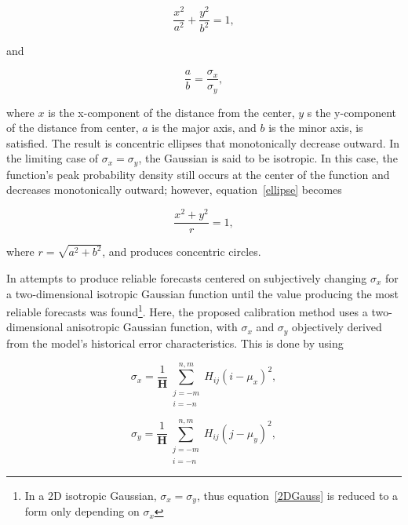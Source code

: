     \begin{equation}
        \label{ellipse}
        \frac{x^2}{a^2} + \frac{y^2}{b^2} = 1,
    \end{equation}

\noindent and

    \begin{equation}
        \frac{a}{b} = \frac{\sigma_x}{\sigma_y},
    \end{equation}

\noindent where $x$ is the x-component of the distance from the center, $y$ s the y-component of the distance from center, $a$ is the major axis, and $b$ is the minor axis, is satisfied.
The result is concentric ellipses that monotonically decrease outward.
In the limiting case of $\sigma_x = \sigma_y$, the Gaussian is said to be isotropic.
In this case, the function's peak probability density still occurs at the center of the function and decreases monotonically outward; however, \mbox{equation \ref{ellipse}} becomes

    \begin{equation*}
        \frac{x^2 + y^2}{r} = 1,
    \end{equation*}

\noindent where $r = \sqrt{a^2 + b^2}$, and produces concentric circles.

In \cite{Sobash2011} attempts to produce reliable forecasts centered on subjectively changing $\sigma_x$ for a two-dimensional isotropic Gaussian function until the value producing the most reliable forecasts was found\footnote{In a 2D isotropic Gaussian, $\sigma_x = \sigma_y$, thus \mbox{equation \ref{2DGauss}} is reduced to a form only depending on $\sigma_x$}.
Here, the proposed calibration method uses a two-dimensional anisotropic Gaussian function, with $\sigma_x$ and $\sigma_y$ objectively derived from the model's historical error characteristics.
This is done by using

    \begin{equation}
        \label{sigmax}
        \sigma_x = \frac{1}{\mathbf{H}} \sum\limits_{\substack{j=-m \\ i=-n}}^{n,m}H_{ij}(i - \mu_x)^2,
    \end{equation}

    \begin{equation}
        \label{sigmay}
        \sigma_y = \frac{1}{\mathbf{H}} \sum\limits_{\substack{j=-m \\ i=-n}}^{n,m}H_{ij}(j - \mu_y)^2,
    \end{equation}

